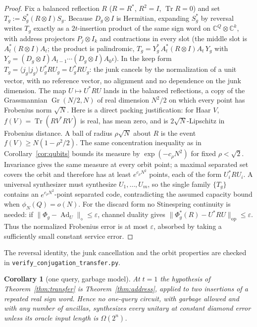 \documentclass[11pt,a4paper]{article}
\theoremstyle{plain}
\newtheorem{corollary}[theorem]{Corollary}
\theoremstyle{definition}
\theoremstyle{remark}
\DeclareMathOperator{\Tr}{Tr}
\DeclareMathOperator{\Gr}{Gr}
\DeclareMathOperator{\Ad}{Ad}
\DeclareMathOperator{\op}{op}
\newcommand{\C}{\mathbb C}
\begin{document}
\begin{proof}
Fix a balanced reflection $R$ ($R=R^{*}$, $R^2=I$, $\Tr R=0$) and set
$T_g:=S_g^{*}(R\otimes I)S_g$. Because $D_g\otimes I$ is Hermitian, expanding $S_g^{*}$ by
reversal writes $T_g$ exactly as a $2t$-insertion product of the same sign word on
$\C^Q\otimes\C^k$, with address projectors $P_j\otimes I_k$ and contractions in every slot (the
middle slot is $A_t^{*}(R\otimes I)A_t$; the product is palindromic,
$T_g=Y_g^{*}\,A_t^{*}(R\otimes I)A_t\,Y_g$ with $Y_g=(D_g\otimes I)A_{t-1}\cdots(D_g\otimes I)A_0\iota$).
In the keep form $T_g=\langle j_g|j_g\rangle\,U_g^{*}RU_g=U_g^{*}RU_g$: the junk cancels by
the normalization of a unit vector, with no reference vector, no alignment and no
dependence on the junk dimension. The map $U\mapsto U^{*}RU$ lands in the balanced
reflections, a copy of the Grassmannian $\Gr(N/2,N)$ of real dimension $N^2/2$ on which every
point has Frobenius norm $\sqrt N$. Here is a direct packing justification:
for Haar $V$, $f(V)=\Tr(RV^*RV)$ is real, has mean zero, and is
$2\sqrt N$-Lipschitz in Frobenius distance. A ball of radius
$\rho\sqrt N$ about $R$ is the event $f(V)\ge N(1-\rho^2/2)$.
The same concentration inequality as in Corollary~\ref{cor:qubits} bounds
its measure by $\exp(-c_\rho N^2)$ for fixed $\rho<\sqrt2$.
Invariance gives the same measure at every orbit point; a maximal separated
set covers the orbit and therefore has at least $e^{c_\rho N^2}$ points,
each of the form $U_i^*RU_i$. A universal synthesizer must synthesize $U_1,\dots,U_m$, so the
single family $\{T_g\}$ contains an $e^{c_\rho N^2}$-point separated code, contradicting the
assumed capacity bound when $\phi_N(Q)=o(N)$. For the discard form no
Stinespring continuity is needed: if
$\|\Phi_g-\Ad_U\|_\diamond\le\varepsilon$, channel duality gives
$\|\Phi_g^*(R)-U^*RU\|_{\op}\le\varepsilon$.
Thus the normalized Frobenius error is at most $\varepsilon$,
absorbed by taking a sufficiently small constant service error.
\end{proof}

The reversal identity, the junk cancellation and the orbit properties are checked in
\texttt{verify\_conjugation\_transfer.py}.

\begin{corollary}[one query, garbage model]\label{cor:onequery}
At $t=1$ the hypothesis of Theorem~\ref{thm:transfer} is Theorem~\ref{thm:address}, applied
to two insertions of a repeated real sign word. Hence no one-query circuit, with garbage
allowed and with any number of ancillas, synthesizes every unitary at constant diamond error
unless its oracle input length is $\Omega(2^n)$.
\end{corollary}
\end{document}
